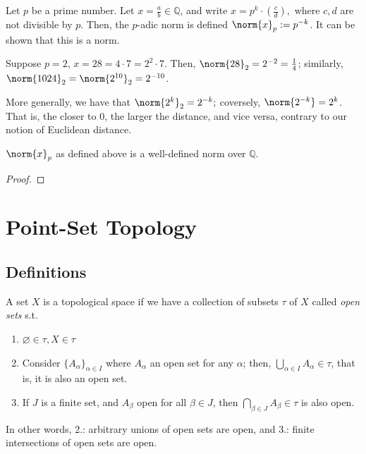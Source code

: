 \begin{example}
    Let $p$ be a prime number. Let $x = \frac{a}{b} \in \mathbb{Q}$, and write $x = p^k\cdot \left(\frac{c}{d}\right),$ where $c, d$ are not divisible by $p$. Then, the $p$-adic norm is defined $\norm{x}_p := p^{-k}$. It can be shown that this is a norm. 

    Suppose $p = 2$, $x = 28 = 4 \cdot 7 = 2^2 \cdot 7$. Then, $\norm{28}_2 = 2^{-2} = \frac{1}{4}$; similarly, $\norm{1024}_2 = \norm{2^{10}}_2 = 2^{-10}$.

    More generally, we have that $\norm{2^k}_2 = 2^{-k};$ coversely, $\norm{2^{-k}} = 2^k$. That is, the closer to $0$, the larger the distance, and vice versa, contrary to our notion of Euclidean distance.
\end{example}

\begin{proposition}
    $\norm{x}_p$ as defined above is a well-defined norm over $\mathbb{Q}$.
\end{proposition}

\begin{proof}
\end{proof}

\section{Point-Set Topology}
\subsection{Definitions}
\begin{definition}
    A set $X$ is a topological space if we have a collection of subsets $\tau$ of $X$ called \emph{open sets} s.t. 
    \begin{enumerate}
        \item $\varnothing \in \tau, X \in \tau$
        \item Consider $\{A_\alpha\}_{\alpha \in I}$ where $A_\alpha$ an open set for any $\alpha$; then, $\bigcup_{\alpha \in I} A_\alpha \in \tau$, that is, it is also an open set.
        \item If $J$ is a finite set, and $A_\beta$ open for all $\beta \in J$, then $\bigcap_{\beta \in J} A_\beta \in \tau$ is also open.
    \end{enumerate}
    In other words, 2.: arbitrary unions of open sets are open, and 3.: finite intersections of open sets are open.
\end{definition}

